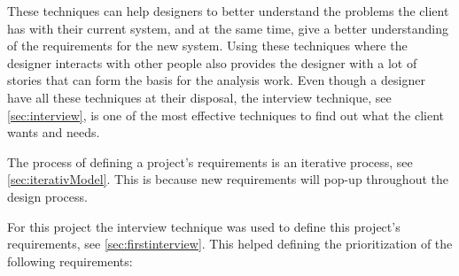 These techniques can help designers to better understand the problems the client has with their current system, and at the same time, give a better understanding of the requirements for the new system.
Using these techniques where the designer interacts with other people also provides the designer with a lot of stories that can form the basis for the analysis work.
Even though a designer have all these techniques at their disposal, the interview technique, see \cref{sec:interview}, is one of the most effective techniques to find out what the client wants and needs.

The process of defining a project's requirements is an iterative process, see \cref{sec:iterativModel}.
This is because new requirements will pop-up throughout the design process.

For this project the interview technique was used to define this project's requirements, see \cref{sec:firstinterview}. This helped defining the prioritization of the following requirements:

